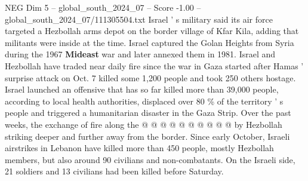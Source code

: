\begin{textsample}{NEG Dim 5 – global\_south\_2024\_07 – Score -1.00 – global\_south\_2024\_07/111305504.txt}
Israel ' s military said its air force targeted a Hezbollah arms depot on the border village of Kfar Kila, adding that militants were inside at the time.
Israel captured the Golan Heights from Syria during the 1967 \textbf{Mideast} war and later annexed them in 1981.
Israel and Hezbollah have traded near daily fire since the war in Gaza started after Hamas ' surprise attack on Oct. 7 killed some 1,200 people and took 250 others hostage.
Israel launched an offensive that has so far killed more than 39,000 people, according to local health authorities, displaced over 80 \% of the territory ' s people and triggered a humanitarian disaster in the Gaza Strip.
Over the past weeks, the exchange of fire along the @ @ @ @ @ @ @ @ @ @ by Hezbollah striking deeper and further away from the border.
Since early October, Israeli airstrikes in Lebanon have killed more than 450 people, mostly Hezbollah members, but also around 90 civilians and non-combatants.
On the Israeli side, 21 soldiers and 13 civilians had been killed before Saturday.

\end{textsample}
